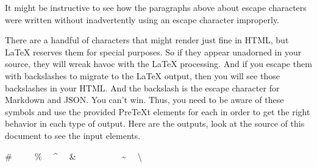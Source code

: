 \documentclass[10pt,]{article}
\theoremstyle{plain}
\theoremstyle{definition}
\theoremstyle{definition}
\theoremstyle{definition}
\theoremstyle{definition}
\theoremstyle{definition}
\theoremstyle{definition}
\numberwithin{equation}{section}
\begin{document}
%
\par
\hypertarget{p-210}{}%
It might be instructive to see how the paragraphs above about escape characters were written without inadvertently using an escape character improperly.%
\par
\hypertarget{p-211}{}%
There are a handful of characters that might render just fine in HTML, but \LaTeX{} reserves them for special purposes.  So if they appear unadorned in your source, they will wreak havoc with the \LaTeX{} processing.  And if you escape them with backslashes to migrate to the \LaTeX{} output, then you will see those backslashes in your HTML.  And the backslash is the escape character for Markdown and JSON.  You can't win.  Thus, you need to be aware of these symbols and use the provided PreTeXt elements for each in order to get the right behavior in each type of output.  Here are the outputs, look at the source of this document to see the input elements.%
\par
\hypertarget{p-212}{}%
\#~~ \textdollar{}~~ \%~~ \textasciicircum{}~~ \&~~ \textunderscore{}~~ \textbraceleft{}~~ \textbraceright{}~~ \textasciitilde{}~~ \textbackslash{}~~ \textasteriskcentered{}~~%
\typeout{************************************************}
\typeout{************************************************}
\end{document}
